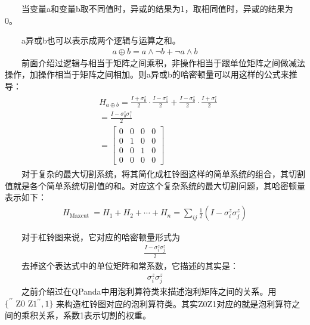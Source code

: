\documentclass[a4paper,11pt,english]{sphinxmanual}
\begin{document}
\sphinxAtStartPar
  当变量a和变量b取不同值时，异或的结果为1，取相同值时，异或的结果为0。

\sphinxAtStartPar
  a异或b也可以表示成两个逻辑与运算之和。
\begin{equation*}
\begin{split}a \oplus b=a \wedge \neg b+\neg a \wedge b\end{split}
\end{equation*}
\sphinxAtStartPar
  前面介绍过逻辑与相当于矩阵之间乘积，非操作相当于跟单位矩阵之间做减法操作，加操作相当于矩阵之间相加。则a异或b的哈密顿量可以用这样的公式来推导：
\begin{equation*}
\begin{split}\begin{aligned} &H_{a \oplus b}=\frac{I+\sigma_{0}^{z}}{2} \cdot \frac{I-\sigma_{1}^{z}}{2}+\frac{I-\sigma_{0}^{z}}{2} \cdot \frac{I+\sigma_{1}^{z}}{2} \\ &=\frac{I-\sigma_{0}^{z} \sigma_{1}^{z}}{2} \\ &=\left[\begin{array}{llll} 0 & 0 & 0 & 0 \\ 0 & 1 & 0 & 0 \\ 0 & 0 & 1 & 0 \\ 0 & 0 & 0 & 0 \end{array}\right] \end{aligned}\end{split}
\end{equation*}
\sphinxAtStartPar
  对于复杂的最大切割系统，将其简化成杠铃图这样的简单系统的组合，其切割值就是各个简单系统切割值的和。对应这个复杂系统的最大切割问题，其哈密顿量表示如下：
\begin{equation*}
\begin{split}H_{\text {Maxcut }}=H_{1}+H_{2}+\cdots+H_{n}=\sum_{i j} \frac{1}{2}\left(I-\sigma_{i}^{z} \sigma_{j}^{z}\right)\end{split}
\end{equation*}
\sphinxAtStartPar
{}

\sphinxAtStartPar
  对于杠铃图来说，它对应的哈密顿量形式为
\begin{equation*}
\begin{split}\frac{I-\sigma_{i}^{z} \sigma_{j}^{z}}{2}\end{split}
\end{equation*}
\sphinxAtStartPar
  去掉这个表达式中的单位矩阵和常系数，它描述的其实是：
\begin{equation*}
\begin{split}\sigma_{i}^{z} \sigma_{j}^{z}\end{split}
\end{equation*}
\sphinxAtStartPar
  之前介绍过在QPanda中用泡利算符类来描述泡利矩阵之间的关系。用 \(\{ ^{\prime \prime} \text { Z0 Z1}^{\prime \prime} \text{} ,1\}\) 来构造杠铃图对应的泡利算符类。其实Z0Z1对应的就是泡利算符之间的乘积关系，系数1表示切割的权重。
\end{document}
